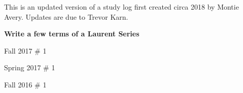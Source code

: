 \documentclass{article}
\begin{document}
This is an updated version of a study log first created circa 2018 by Montie Avery.
Updates are due to Trevor Karn.


\textbf{Write a few terms of a Laurent Series}
\begin{todolist}
	\item Fall 2017 \# 1
	\item Spring 2017 \# 1
	\item Fall 2016 \# 1
	\item 
\end{todolist}
\end{document}
